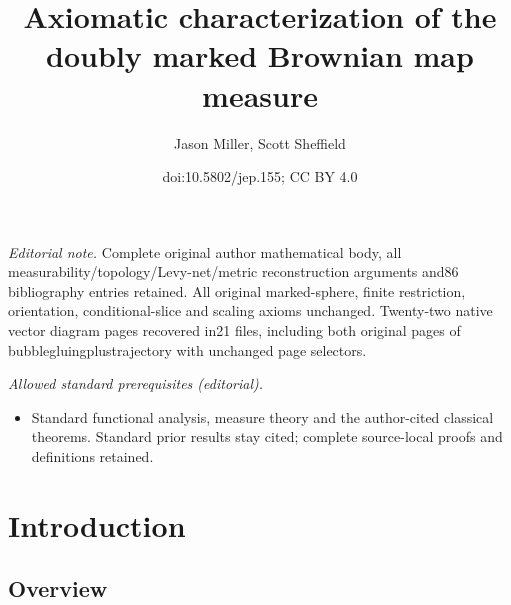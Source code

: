 \documentclass[10pt]{amsart}
\title{Axiomatic characterization of the doubly marked Brownian map measure}
\author{Jason Miller, Scott Sheffield}
\date{doi:10.5802/jep.155; CC BY 4.0}
\theoremstyle{plain}
\numberwithin{theorem}{section}
\theoremstyle{definition}
\begin{document}
\maketitle
\noindent\textit{Editorial note.} Complete original author mathematical body, all measurability/topology/Levy-net/metric reconstruction arguments and86 bibliography entries retained. All original marked-sphere, finite restriction, orientation, conditional-slice and scaling axioms unchanged. Twenty-two native vector diagram pages recovered in21 files, including both original pages of bubblegluingplustrajectory with unchanged page selectors.\par\medskip
\noindent\textit{Allowed standard prerequisites (editorial).}\begin{itemize}
\item Standard functional analysis, measure theory and the author-cited classical theorems. Standard prior results stay cited; complete source-local proofs and definitions retained.
\end{itemize}\medskip

\setcounter{tocdepth}{2}
\tableofcontents


\section{Introduction}
\label{sec::introduction}

\subsection{Overview}
\end{document}
